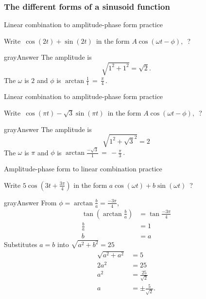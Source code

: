 \subsubsection{The different forms of a sinusoid function}
\begin{problem}
  Linear combination to amplitude-phase form practice 
\end{problem}
Write $\, \cos (2t)+\sin (2t)\,$ in the form $A\cos (\omega t-\phi ),\,$ ?
\begin{mybox}{gray}{Answer}
  The amplitude is
  \begin{equation*}
    \sqrt{1^2 + 1^2} = \sqrt{2}. 
  \end{equation*}
  The $\omega$ is $2$ and $\phi$ is $\arctan \frac{1}{1}\, = \, \frac{\pi}{4}\, .$
\end{mybox}

\begin{problem}
  Linear combination to amplitude-phase form practice 
\end{problem}
Write $\, \cos (\pi t)-\sqrt {3}\sin (\pi t)\,$ in the form $A\cos (\omega t-\phi ),\,$ ?
\begin{mybox}{gray}{Answer}
  The amplitude is
  \begin{equation*}
    \sqrt{1^2 + {\sqrt{3}}^2} = 2
  \end{equation*}
  The $\omega$ is $\pi$ and $\phi$ is $\arctan \frac{-\sqrt{3}}{1}\, = \, - \frac{\pi}{3}\, .$
\end{mybox}


\begin{problem}
  Amplitude-phase form to linear combination practice
\end{problem}
Write $5\cos \left(3t+\frac{3\pi }{4}\right)$ in the form $a\cos (\omega t)+b\sin (\omega t)\,$ ?
\begin{mybox}{gray}{Answer}
  From $\phi = \arctan{ \frac{b}{a}} = \frac{-3 \pi}{4}$,
  \begin{align*}
    \tan (\arctan{ \frac{b}{a}}) &= \tan \frac{-3 \pi}{4} \\
    \frac{b}{a} &= 1 \\
    b &= a
  \end{align*}
  Substitutes $a = b$ into $\sqrt{a^2 + b^2} = 25$   
  \begin{align*}
    \sqrt{a^2 + a^2} &= 5\\
    2a^2 &= 25 \\
    a^2 &= \frac{25}{\sqrt{2}}\\
    a &= \pm \frac{5}{\sqrt{2}}. 
  \end{align*}
\end{mybox}

